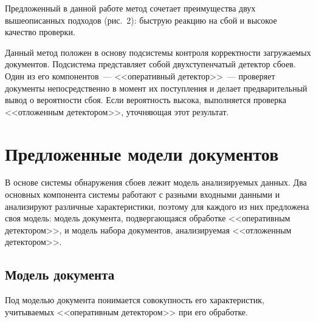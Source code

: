 \begin{multicols}{2}
    Предложенный в данной работе метод сочетает преимущества двух 
вышеописанных подходов (рис.~2): быструю реакцию на сбой и высокое 
качество проверки. 



  Данный метод положен в основу подсистемы контроля корректности 
загружаемых документов. Подсистема представляет собой двухступенчатый 
детектор сбоев. Один из его компонентов~--- <<оперативный детектор>>~--- 
проверяет документы непосредственно в момент их поступления и делает 
предварительный вывод о вероятности сбоя. Если вероятность высока, 
выполняется проверка <<отложенным детектором>>, уточняющая этот 
результат.

\section{Предложенные модели документов}
  
    В основе системы обнаружения сбоев лежит модель анализируемых данных. 
Два основных компонента системы работают с разными входными данными и 
анализируют различные характеристики, поэтому для каждого из них 
предложена своя модель: модель документа, подвергающаяся обработке 
<<оперативным детектором>>, и модель набора документов, анализируемая 
<<отложенным детектором>>.

\subsection{Модель документа}
  
    Под моделью документа понимается совокупность его характеристик, 
учитываемых <<оперативным детектором>> при его обработке.   


\end{multicols}
